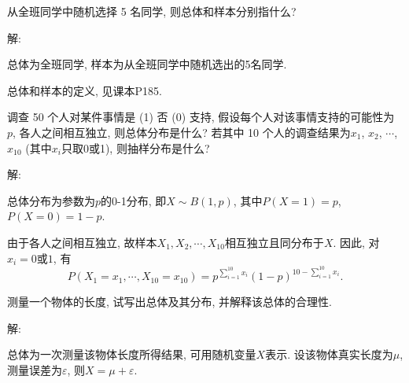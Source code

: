 \documentclass[standard]{ExBook}
\renewenvironment{shaded}{%
  \def\FrameCommand{\fboxsep=\FrameSep \colorbox{shadecolor}}%
  \MakeFramed{\advance\hsize-\width \FrameRestore}%
}{%
  \endMakeFramed
}
\begin{document}
\begin{qitems}
\vspace{2.5cm-5em}

    \begin{bbox}
    \begin{shaded}
        \qitem
从全班同学中随机选择 5 名同学, 则总体和样本分别指什么?
    \end{shaded}
    \end{bbox}

\vspace{\dimexpr2.5cm-5em\relax}

解:

总体为全班同学, 样本为从全班同学中随机选出的5名同学.

\textcolor{themeColor}{\selectfont {} 总体和样本的定义, 见课本P185.}

\vspace{2.5cm-5em}

    \begin{bbox}
    \begin{shaded}
        \qitem
调查 50 个人对某件事情是 (1) 否 (0) 支持, 假设每个人对该事情支持的可能性为 $p$, 各人之间相互独立, 则总体分布是什么? 若其中 10 个人的调查结果为$x_1$, $x_2$, $\cdots$, $x_{10}$ (其中$x_i$只取0或1), 则抽样分布是什么?
    \end{shaded}
    \end{bbox}

\vspace{\dimexpr2.5cm-5em\relax}

解:

总体分布为参数为$p$的0-1分布, 即$X\sim B(1,p)$, 其中$P(X=1)=p$, $P(X=0)=1-p$.

由于各人之间相互独立, 故样本$X_1,X_2,\cdots,X_{10}$相互独立且同分布于$X$. 因此, 对$x_i=0$或$1$, 有
$$P(X_1=x_1,\cdots,X_{10}=x_{10})=p^{\sum\limits_{i=1}^{10}x_i}(1-p)^{10-\sum\limits_{i=1}^{10}x_i}.$$

\vspace{2.5cm-5em}

    \begin{bbox}
    \begin{shaded}
        \qitem
测量一个物体的长度, 试写出总体及其分布, 并解释该总体的合理性.
    \end{shaded}
    \end{bbox}

\vspace{\dimexpr2.5cm-5em\relax}

解:

总体为一次测量该物体长度所得结果, 可用随机变量$X$表示. 设该物体真实长度为$\mu$, 测量误差为$\varepsilon$, 则$X=\mu+\varepsilon$.


\end{qitems}
\end{document}

